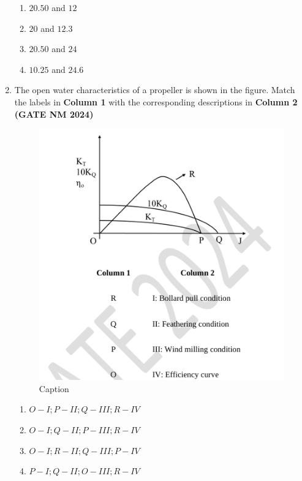 \documentclass[journal,15pt,onecolumn]{IEEEtran}
\theoremstyle{remark}
\begin{document}
\begin{enumerate}
    \begin{enumerate}
        \item $20.50$ and $12$
        \item $20$ and $12.3$
        \item $20.50$ and $24$
        \item $10.25$ and $24.6$
    \end{enumerate}



    \item
    The open water characteristics of a propeller is shown in the figure. Match the labels in \textbf{Column 1} with the corresponding descriptions in \textbf{Column 2}\hfill \textbf{ (GATE NM 2024)}
    
\begin{figure}[h!]
    \centering
    \includegraphics[width=0.5\linewidth]{figures.tex/Screenshot 2025-08-21 160411.png}
    \caption{Caption}
    \label{fig:placeholder}
\end{figure}


\begin{enumerate}
    \item $O - I; P - II; Q - III; R - IV$
    \item $O - I; Q - II; P - III; R - IV$
    \item $O - I; R - II; Q - III; P - IV$
    \item $P - I; Q - II; O - III; R - IV$
\end{enumerate}


\end{enumerate}
\end{document}
